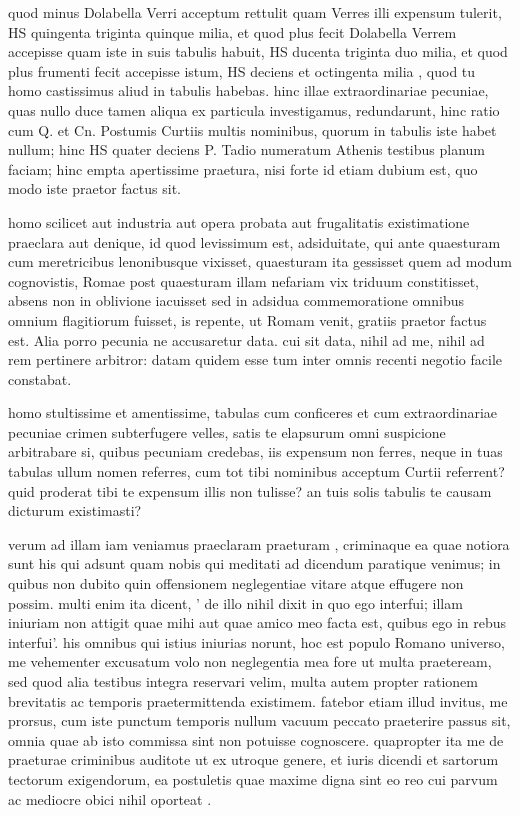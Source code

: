  quod minus Dolabella Verri acceptum rettulit quam Verres illi expensum tulerit, HS quingenta triginta quinque milia, et quod plus fecit Dolabella Verrem accepisse quam iste in suis tabulis habuit, HS ducenta triginta duo milia, et quod plus frumenti fecit accepisse istum, HS deciens et octingenta milia , quod tu homo castissimus aliud in tabulis habebas. hinc illae extraordinariae pecuniae, quas nullo duce tamen aliqua ex particula investigamus, redundarunt, hinc ratio cum Q. et Cn. Postumis Curtiis multis nominibus, quorum in tabulis iste habet nullum; hinc HS quater deciens P. Tadio numeratum Athenis testibus planum faciam; hinc empta apertissime praetura, nisi forte id etiam dubium est, quo modo iste praetor factus sit.

 homo scilicet aut industria aut opera probata aut frugalitatis existimatione praeclara aut denique, id quod levissimum est, adsiduitate, qui ante quaesturam cum meretricibus lenonibusque vixisset, quaesturam ita gessisset quem ad modum cognovistis, Romae post quaesturam illam nefariam vix triduum constitisset, absens non in oblivione iacuisset sed in adsidua commemoratione omnibus omnium flagitiorum fuisset, is repente, ut Romam venit, gratiis praetor factus est. Alia porro pecunia ne accusaretur data. cui sit data, nihil ad me, nihil ad rem pertinere arbitror: datam quidem esse tum inter omnis recenti negotio facile constabat.

 homo stultissime et amentissime, tabulas cum conficeres et cum extraordinariae pecuniae crimen subterfugere velles, satis te elapsurum omni suspicione arbitrabare si, quibus pecuniam credebas, iis expensum non ferres, neque in tuas tabulas ullum nomen referres, cum tot tibi nominibus acceptum Curtii referrent? quid proderat tibi te expensum illis non tulisse? an tuis solis tabulis te causam dicturum existimasti?

 verum ad illam iam veniamus praeclaram praeturam , criminaque ea quae notiora sunt his qui adsunt quam nobis qui meditati ad dicendum paratique venimus; in quibus non dubito quin offensionem neglegentiae vitare atque effugere non possim. multi enim ita dicent, ' de illo nihil dixit in quo ego interfui; illam iniuriam non attigit quae mihi aut quae amico meo facta est, quibus ego in rebus interfui'. his omnibus qui istius iniurias norunt, hoc est populo Romano universo, me vehementer excusatum volo non neglegentia mea fore ut multa praeteream, sed quod alia testibus integra reservari velim, multa autem propter rationem brevitatis ac temporis praetermittenda existimem. fatebor etiam illud invitus, me prorsus, cum iste punctum temporis nullum vacuum peccato praeterire passus sit, omnia quae ab isto commissa sint non potuisse cognoscere. quapropter ita me de praeturae criminibus auditote ut ex utroque genere, et iuris dicendi et sartorum tectorum exigendorum, ea postuletis quae maxime digna sint eo reo cui parvum ac mediocre obici nihil oporteat .

